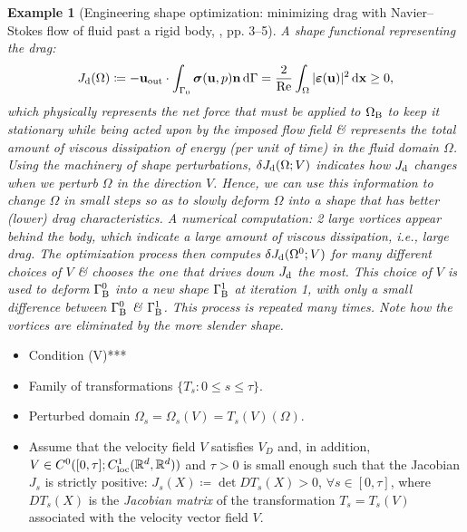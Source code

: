 \documentclass{article}
\newtheorem{example}{Example}
\begin{document}
\begin{example}[Engineering shape optimization: minimizing drag with Navier--Stokes flow of fluid past a rigid body, \cite{Walker2015}, pp. 3--5]
	A shape functional representing the drag:
	\begin{equation}
		J_{\rm d}(\Omega)\coloneqq-{\bf u}_{\rm out}\cdot\int_{\Gamma_0} \boldsymbol{\sigma}({\bf u},p){\bf n}\,{\rm d}\Gamma = \frac{2}{{\rm Re}}\int_\Omega |\boldsymbol{\varepsilon}({\bf u})|^2\,{\rm d}{\bf x}\ge0,
	\end{equation}
	which physically represents the net force that must be applied to $\Omega_{\rm B}$ to keep it stationary while being acted upon by the imposed flow field \& represents the total amount of viscous dissipation of energy (per unit of time) in the fluid domain $\Omega$. Using the machinery of shape perturbations, $\delta J_{\rm d}(\Omega;V)$ indicates how $J_{\rm d}$ changes when we perturb $\Omega$ in the direction $V$. Hence, we can use this information to change $\Omega$ in small steps so as to slowly deform $\Omega$ into a shape that has better (lower) drag characteristics. A numerical computation: 2 large vortices appear behind the body, which indicate a large amount of viscous dissipation, i.e., large drag. The optimization process then computes $\delta J_{\rm d}(\Omega^0;V)$ for many different choices of $V$ \& chooses the one that drives down $J_{\rm d}$ the most. This choice of $V$ is used to deform $\Gamma_{\rm B}^0$ into a new shape $\Gamma_{\rm B}^1$ at iteration 1, with only a small difference between $\Gamma_{\rm B}^0$ \& $\Gamma_{\rm B}^1$. This process is repeated many times. Note how the vortices are eliminated by the more slender shape.
\end{example}

\begin{itemize}
	\item Condition (V)***
	\item Family of transformations $\{T_s:0\le s\le\tau\}$.
	\item Perturbed domain $\Omega_s = \Omega_s(V) = T_s(V)(\Omega)$.
	\item Assume that the velocity field $V$ satisfies $V_D$ and, in addition, $V\in C^0([0,\tau];C_{\rm loc}^1(\mathbb{R}^d,\mathbb{R}^d))$ and $\tau > 0$ is small enough such that the Jacobian $J_s$ is strictly positive: $J_s(X)\coloneqq\det DT_s(X) > 0$, $\forall s\in[0,\tau]$, where $DT_s(X)$ is the \textit{Jacobian matrix} of the transformation $T_s = T_s(V)$ associated with the velocity vector field $V$.
\end{itemize}
\end{document}
